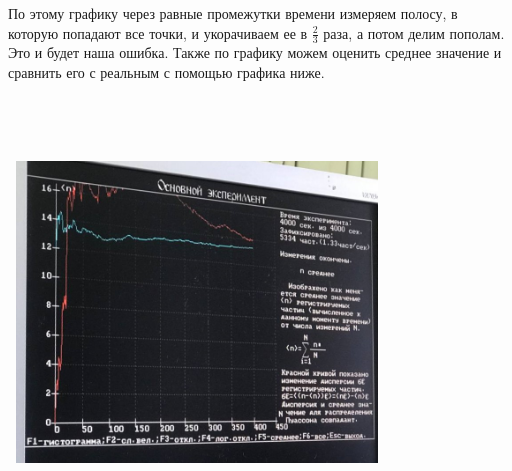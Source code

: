 \documentclass[a4paper,14pt]{extarticle}
\begin{document}
	
	По этому графику через равные промежутки времени измеряем полосу, в которую попадают все точки, и  укорачиваем ее в $\frac{2}{3}$ раза, а потом делим пополам. Это и будет наша ошибка. Также по графику можем оценить среднее значение и сравнить его с реальным с помощью графика ниже.
	\newline
	\bigskip
	\\
	\\
	\\
	\\
	\\
	
	
	
	
	\includegraphics[width= 10cm, height=8cm]{2.jpg}
	
	
	
\end{document}
